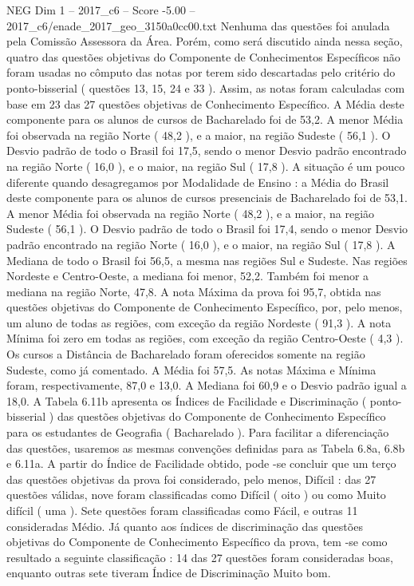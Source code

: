 \begin{textsample}{NEG Dim 1 – 2017\_c6 – Score -5.00 – 2017\_c6/enade\_2017\_geo\_3150a0cc00.txt}
Nenhuma das questões foi anulada pela Comissão Assessora da Área.
Porém, como será discutido ainda nessa seção, quatro das questões objetivas do Componente de Conhecimentos Específicos não foram usadas no cômputo das notas por terem sido descartadas pelo critério do ponto-bisserial ( questões 13, 15, 24 e 33 ).
Assim, as notas foram calculadas com base em 23 das 27 questões objetivas de Conhecimento Específico.
A Média deste componente para os alunos de cursos de Bacharelado foi de 53,2.
A menor Média foi observada na região Norte ( 48,2 ), e a maior, na região Sudeste ( 56,1 ).
O Desvio padrão de todo o Brasil foi 17,5, sendo o menor Desvio padrão encontrado na região Norte ( 16,0 ), e o maior, na região Sul ( 17,8 ).
A situação é um pouco diferente quando desagregamos por Modalidade de Ensino : a Média do Brasil deste componente para os alunos de cursos presenciais de Bacharelado foi de 53,1.
A menor Média foi observada na região Norte ( 48,2 ), e a maior, na região Sudeste ( 56,1 ).
O Desvio padrão de todo o Brasil foi 17,4, sendo o menor Desvio padrão encontrado na região Norte ( 16,0 ), e o maior, na região Sul ( 17,8 ).
A Mediana de todo o Brasil foi 56,5, a mesma nas regiões Sul e Sudeste.
Nas regiões Nordeste e Centro-Oeste, a mediana foi menor, 52,2.
Também foi menor a mediana na região Norte, 47,8.
A nota Máxima da prova foi 95,7, obtida nas questões objetivas do Componente de Conhecimento Específico, por, pelo menos, um aluno de todas as regiões, com exceção da região Nordeste ( 91,3 ).
A nota Mínima foi zero em todas as regiões, com exceção da região Centro-Oeste ( 4,3 ).
Os cursos a Distância de Bacharelado foram oferecidos somente na região Sudeste, como já comentado.
A Média foi 57,5.
As notas Máxima e Mínima foram, respectivamente, 87,0 e 13,0.
A Mediana foi 60,9 e o Desvio padrão igual a 18,0.
A Tabela 6.11b apresenta os Índices de Facilidade e Discriminação ( ponto-bisserial ) das questões objetivas do Componente de Conhecimento Específico para os estudantes de Geografia ( Bacharelado ).
Para facilitar a diferenciação das questões, usaremos as mesmas convenções definidas para as Tabela 6.8a, 6.8b e 6.11a.
A partir do Índice de Facilidade obtido, pode -se concluir que um terço das questões objetivas da prova foi considerado, pelo menos, Difícil : das 27 questões válidas, nove foram classificadas como Difícil ( oito ) ou como Muito difícil ( uma ).
Sete questões foram classificadas como Fácil, e outras 11 consideradas Médio.
Já quanto aos índices de discriminação das questões objetivas do Componente de Conhecimento Específico da prova, tem -se como resultado a seguinte classificação : 14 das 27 questões foram consideradas boas, enquanto outras sete tiveram Índice de Discriminação Muito bom.

\end{textsample}
